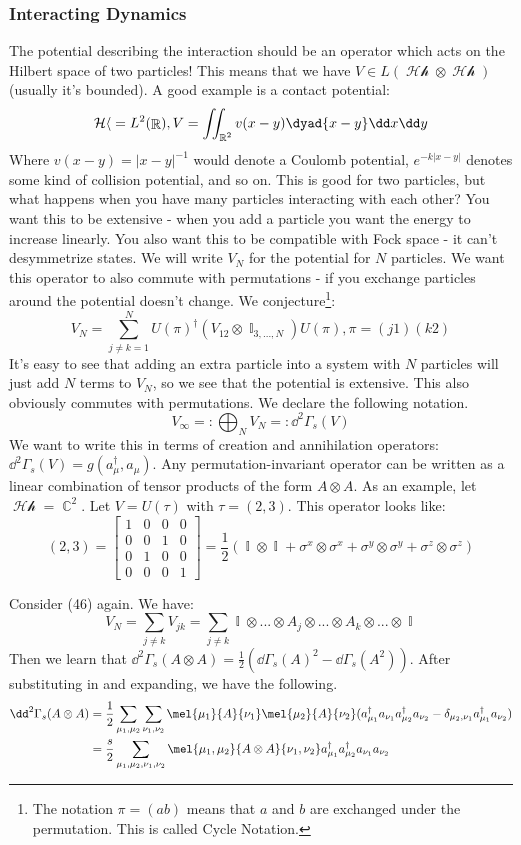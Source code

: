 \documentclass{article}
\DeclareMathOperator{\Hh}{\mathcal{Hh}}
\DeclareMathOperator{\RR}{\mathbb{R}}
\DeclareMathOperator{\II}{\mathbb{I}}
\DeclareMathOperator{\CC}{\mathbb{C}}
\begin{document}
\subsubsection{Interacting Dynamics}
The potential describing the interaction should be an operator which acts on the Hilbert space of two particles! This means that we have $V \in L(\Hh\otimes \Hh)$ (usually it's bounded). A good example is a contact potential:
\[\Hh = L^2(\RR), V = \iint_{\RR^2} v(x-y)\dyad{x-y}\dd x \dd y\]
Where $v(x-y) = |x-y|^{-1}$ would denote a Coulomb potential, $e^{-k|x-y|}$ denotes some kind of collision potential, and so on. This is good for two particles, but what happens when you have many particles interacting with each other? You want this to be extensive - when you add a particle you want the energy to increase linearly. You also want this to be compatible with Fock space - it can't desymmetrize states. We will write $V_N$ for the potential for $N$ particles. We want this operator to also commute with permutations - if you exchange particles around the potential doesn't change. We conjecture\footnote{The notation $\pi=(a b)$ means that $a$ and $b$ are exchanged under the permutation. This is called Cycle Notation.}:
\begin{equation}
V_N = \sum_{j\neq k = 1}^N U(\pi)^\dagger \left(V_{12} \otimes \II_{3,...,N}\right) U(\pi), \pi=(j 1)(k 2)
\end{equation}
It's easy to see that adding an extra particle into a system with $N$ particles will just add $N$ terms to $V_N$, so we see that the potential is extensive. This also obviously commutes with permutations. We declare the following notation.
\[V_\infty =: \bigoplus_N V_N =: \dd^2 \Gamma_s(V)\]
We want to write this in terms of creation and annihilation operators: $\dd^2\Gamma_s(V) = g(a_\mu^\dagger,a_\mu)$. Any permutation-invariant operator can be written as a linear combination of tensor products of the form $A \otimes A$. As an example, let $\Hh = \CC^2$. Let $V = U(\tau)$ with $\tau = (2,3)$. This operator looks like:
\[(2,3) = \begin{bmatrix}1&0&0&0\\0&0&1&0\\0&1&0&0\\0&0&0&1\end{bmatrix}= \frac{1}{2}\left(\II\otimes \II + \sigma^x\otimes\sigma^x + \sigma^y\otimes\sigma^y + \sigma^z\otimes \sigma^z\right)\]

Consider (46) again. We have:
\[V_N = \sum_{j\neq k}V_{jk} = \sum_{j\neq k}\II\otimes...\otimes A_j\otimes ... \otimes A_k\otimes ... \otimes \II\]
 Then we learn that $\dd^2\Gamma_s(A\otimes A) = \frac{1}{2}(\dd\Gamma_s(A)^2-\dd\Gamma_s(A^2))$. After substituting in and expanding, we have the following.
\begin{align}
\dd^2\Gamma_s(A\otimes A) &= \frac{1}{2}\sum_{\mu_1,\mu_2}\sum_{\nu_1,\nu_2}\mel{\mu_1}{A}{\nu_1}\mel{\mu_2}{A}{\nu_2}(a_{\mu_1}^\dagger a_{\nu_1} a_{\mu_2}^\dagger a_{\nu_2} - \delta_{\mu_2,\nu_1}a^\dagger_{\mu_1} a_{\nu_2})\\
&= \frac{s}{2}\sum_{\mu_1,\mu_2,\nu_1,\nu_2}\mel{\mu_1,\mu_2}{A\otimes A}{\nu_1,\nu_2} a_{\mu_1}^\dagger a_{\mu_2}^\dagger a_{\nu_1} a_{\nu_2}
\end{align}
\end{document}
